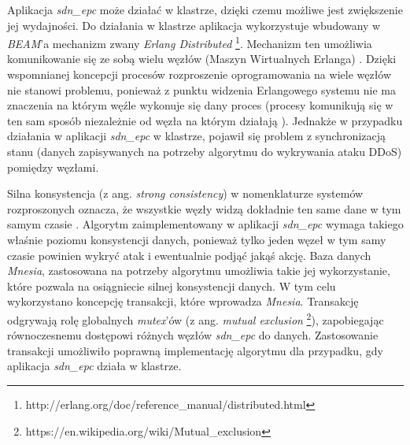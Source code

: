 Aplikacja \textit{sdn\_epc} może działać w klastrze, dzięki czemu możliwe jest
zwiększenie jej wydajności. Do działania w klastrze aplikacja wykorzystuje
wbudowany w \textit{BEAM}'a mechanizm zwany \textit{Erlang Distributed}
\footnote{http://erlang.org/doc/reference\_manual/distributed.html}. Mechanizm
ten umożliwia komunikowanie się ze sobą wielu węzłów (Maszyn Wirtualnych
Erlanga) \cite{erldocs}. Dzięki wspomnianej koncepcji procesów rozproszenie
oprogramowania na wiele węzłów nie stanowi problemu, ponieważ z punktu widzenia
Erlangowego systemu nie ma znaczenia na którym węźle wykonuje się dany proces
(procesy komunikują się w ten sam sposób niezależnie od węzła na którym
działają \cite{erldocs}). Jednakże w przypadku działania w aplikacji
\textit{sdn\_epc} w klastrze, pojawił się problem z synchronizacją stanu (danych
zapisywanych na potrzeby algorytmu do wykrywania ataku DDoS) pomiędzy węzłami.

Silna konsystencja (z ang. \textit{strong consistency}) w nomenklaturze systemów
rozproszonych oznacza, że wszystkie węzły widzą dokładnie ten same dane w
tym samym czasie \cite{distrforfunandprof}. Algorytm zaimplementowany w
aplikacji \textit{sdn\_epc} wymaga takiego właśnie poziomu konsystencji danych,
ponieważ tylko jeden węzeł w tym samy czasie powinien wykryć atak i ewentualnie
podjąć jakąś akcję. Baza danych \textit{Mnesia}, zastosowana na potrzeby
algorytmu umożliwia takie jej wykorzystanie, które pozwala na osiągniecie silnej
konsystencji danych. W tym celu wykorzystano koncepcję transakcji, które
wprowadza \textit{Mnesia}. Transakcję odgrywają rolę globalnych \textit{mutex}'ów
(z ang. \textit{mutual exclusion}
\footnote{https://en.wikipedia.org/wiki/Mutual\_exclusion}), zapobiegając
równoczesnemu dostępowi różnych węzłów \textit{sdn\_epc} do danych. Zastosowanie
transakcji umożliwiło poprawną implementację algorytmu dla przypadku, gdy
aplikacja \textit{sdn\_epc} działa w klastrze.